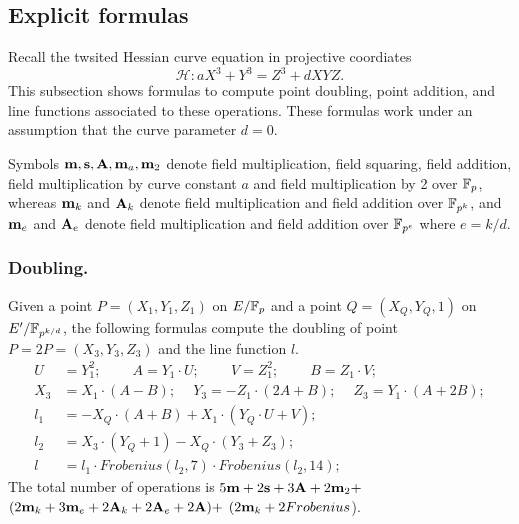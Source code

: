 
\subsection{Explicit formulas}

Recall the twsited Hessian curve equation in projective coordiates
$$ \mathcal{H}: a X^3 + Y^3 = Z^3 + d X Y Z. $$
This subsection shows formulas to compute point doubling, point addition, and line functions associated to these operations.
These formulas work under an assumption that the curve parameter $d = 0$.

Symbols $\textbf{m}, \textbf{s}, \textbf{A}, \textbf{m}_{a}, \textbf{m}_{2}$ denote
field multiplication, field squaring, field addition,
field multiplication by curve constant $a$ and field multiplication by 2 over $\mathbb{F}_{p}$,
whereas $\textbf{m}_k$ and $\textbf{A}_k$ denote
field multiplication and field addition over $\mathbb{F}_{p^k}$,
and $\textbf{m}_e$ and $\textbf{A}_e$ denote
field multiplication and field addition over $\mathbb{F}_{p^e}$ where $e = k/d$.

\subsubsection{Doubling.}
Given a point $P = (X_1,Y_1,Z_1)$ on $E/\mathbb{F}_{p}$ and a point $Q = (X_Q,Y_Q,1)$ on $E'/\mathbb{F}_{p^{k/d}}$,
the following formulas compute the doubling of point $P = 2P = (X_3,Y_3,Z_3)$ and the line function $l$.
\begin{align*}
U &= Y_1^2;\	\qquad	A = Y_1 \cdot U;\	\qquad
V = Z_1 ^ 2;\	\qquad	B = Z_1 \cdot V;\\
X_3 &= X_1 \cdot (A - B);\	\quad
Y_3 = -Z_1 \cdot (2A + B);\	\quad
Z_3 = Y_1 \cdot (A + 2B);\\
l_1 &= -X_Q \cdot (A + B) + X_1 \cdot (Y_Q \cdot U + V);	\\
l_2 &= X_3 \cdot (Y_Q + 1) - X_Q \cdot (Y_3 + Z_3);	\\
l &= l_1 \cdot Frobenius(l_2,7) \cdot Frobenius(l_2,14);
\end{align*}
The total number of operations is
$ 5\textbf{m} +2\textbf{s} + 3\textbf{A} + 2\textbf{m}_{2} + $
$ (2\textbf{m}_k + 3\textbf{m}_e + 2\textbf{A}_k + 2\textbf{A}_e + 2\textbf{A}) + $
$ (2\textbf{m}_k + 2Frobenius$).

